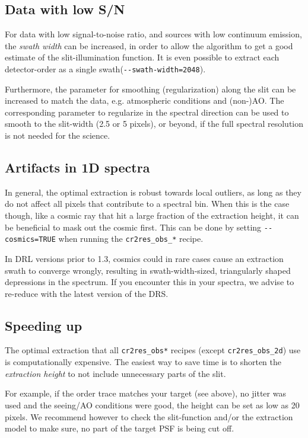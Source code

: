 \subsection{Data with low S/N}
For data with low signal-to-noise ratio, and sources with low continuum
emission, the \emph{swath width} can be increased, in order to allow the
algorithm to get a good estimate of the slit-illumination function. It is even
possible to extract each detector-order as a single
swath(\verb!--swath-width=2048!).
 
Furthermore, the parameter for smoothing (regularization) along the slit can be
increased to match the data, e.g. atmospheric conditions and (non-)AO. The
corresponding parameter to regularize in the spectral direction can be used to
smooth to the slit-width (2.5 or 5 pixels), or beyond, if the full spectral
resolution is not needed for the science.

\subsection{Artifacts in 1D spectra}
In general, the optimal extraction is robust towards local outliers, as long as
they do not affect all pixels that contribute to a spectral bin. When this is
the case though, like a cosmic ray that hit a large fraction of the extraction
height, it can be beneficial to mask out the cosmic first. This can be done by
setting \verb!--cosmics=TRUE! when running the \verb!cr2res_obs_*! recipe.

In DRL versions prior to 1.3, cosmics could in rare cases cause an extraction
swath to converge wrongly, resulting in swath-width-sized, triangularly shaped
depressions in the spectrum. If you encounter this in your spectra, we advise to
re-reduce with the latest version of the DRS.

\subsection{Speeding up}
The optimal extraction that all \verb!cr2res_obs*! recipes (except
\verb!cr2res_obs_2d!) use is computationally expensive. The easiest way to save
time is to shorten the \emph{extraction height} to not include unnecessary parts
of the slit. 

For example, if the order trace matches your target (see above), no jitter was
used and the seeing/AO conditions were good, the height can be set as low as 20
pixels. We recommend however to check the slit-function and/or the extraction
model to make sure, no part of the target PSF is being cut off.

